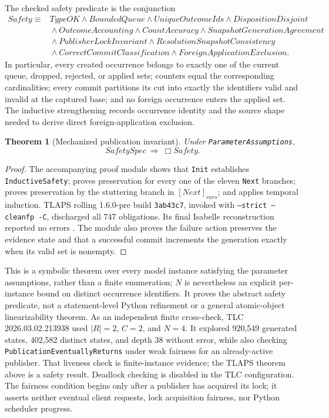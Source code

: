 \documentclass[11pt]{article}
\theoremstyle{definition}
\theoremstyle{plain}
\newtheorem{theorem}[definition]{Theorem}
\begin{document}
The checked safety predicate is the conjunction
\[
\begin{split}
\mathit{Safety}\equiv{}&
\mathit{TypeOK}\land\mathit{BoundedQueue}\land
\mathit{UniqueOutcomeIds}\land\mathit{DispositionDisjoint}\\
&{}\land\mathit{OutcomeAccounting}\land\mathit{CountAccuracy}
\land\mathit{SnapshotGenerationAgreement}\\
&{}\land\mathit{PublisherLockInvariant}
\land\mathit{ResolutionSnapshotConsistency}\\
&{}\land\mathit{CorrectCommitClassification}
\land\mathit{ForeignApplicationExclusion}.
\end{split}
\]
In particular, every created occurrence belongs to exactly one of the current
queue, dropped, rejected, or applied sets; counters equal the corresponding
cardinalities; every commit partitions its cut into exactly the identifiers
valid and invalid at the captured base; and no foreign occurrence enters the
applied set.  The inductive strengthening records occurrence identity and the
source shape needed to derive direct foreign-application exclusion.

\begin{theorem}[Mechanized publication invariant]
\label{thm:tlaps-safety}
Under \texttt{ParameterAssumptions},
\[
\mathit{SafetySpec}\ \Longrightarrow\ \Box\mathit{Safety}.
\]
\end{theorem}

\begin{proof}
The accompanying proof module shows that \texttt{Init} establishes
\texttt{InductiveSafety}; proves preservation for every one of the eleven
\texttt{Next} branches; proves preservation by the stuttering branch in
$[Next]_{\mathit{vars}}$; and applies temporal induction.  TLAPS rolling
1.6.0-pre build \texttt{3ab43c7}, invoked with
\texttt{--strict --cleanfp -C}, discharged all 747 obligations.  Its final
Isabelle reconstruction reported no errors \cite{cousineau2012}.
The module also proves the failure action preserves the evidence state and that
a successful commit increments the generation exactly when its valid set is
nonempty.
\end{proof}

This is a symbolic theorem over every model instance satisfying the parameter
assumptions, rather than a finite enumeration; $N$ is nevertheless an explicit
per-instance bound on distinct occurrence identifiers.  It proves the abstract
safety predicate, not a statement-level Python refinement or a general
atomic-object
linearizability theorem.  As an independent finite cross-check, TLC
2026.03.02.213938 used $|R|=2$, $C=2$, and $N=4$.  It explored 920,549
generated states, 402,582 distinct states, and depth 38 without error, while
also checking \texttt{PublicationEventuallyReturns} under weak fairness for an
already-active publisher.  That liveness check is finite-instance evidence;
the TLAPS theorem above is a safety result.  Deadlock checking is disabled in
the TLC configuration.  The fairness condition begins only after a publisher
has acquired its lock; it asserts neither eventual client requests, lock
acquisition fairness, nor Python scheduler progress.
\end{document}
